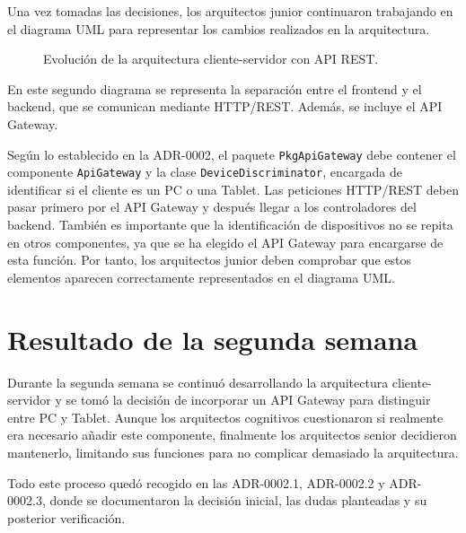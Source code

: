 Una vez tomadas las decisiones, los arquitectos junior continuaron trabajando en el diagrama UML para representar los cambios realizados en la arquitectura.

\begin{landscape}
\begin{figure}[p]
    \centering
    
    \caption{Evolución de la arquitectura cliente-servidor con API REST.}
    \label{fig:arquitectura-api-rest-gateway}
\end{figure}
\end{landscape}

En este segundo diagrama se representa la separación entre el frontend y el backend, que se comunican mediante HTTP/REST. Además, se incluye el API Gateway.

Según lo establecido en la ADR-0002, el paquete \texttt{PkgApiGateway} debe contener el componente \texttt{ApiGateway} y la clase \texttt{DeviceDiscriminator}, encargada de identificar si el cliente es un PC o una Tablet. Las peticiones HTTP/REST deben pasar primero por el API Gateway y después llegar a los controladores del backend. También es importante que la identificación de dispositivos no se repita en otros componentes, ya que se ha elegido el API Gateway para encargarse de esta función. Por tanto, los arquitectos junior deben comprobar que estos elementos aparecen correctamente representados en el diagrama UML.

\section{Resultado de la segunda semana}

Durante la segunda semana se continuó desarrollando la arquitectura cliente-servidor y se tomó la decisión de incorporar un API Gateway para distinguir entre PC y Tablet. Aunque los arquitectos cognitivos cuestionaron si realmente era necesario añadir este componente, finalmente los arquitectos senior decidieron mantenerlo, limitando sus funciones para no complicar demasiado la arquitectura.

Todo este proceso quedó recogido en las ADR-0002.1, ADR-0002.2 y ADR-0002.3, donde se documentaron la decisión inicial, las dudas planteadas y su posterior verificación.
